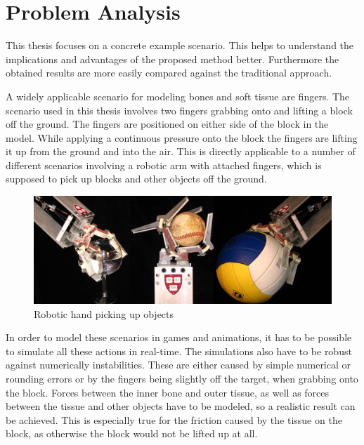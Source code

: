 \chapter{Problem Analysis}
\label{cha:problem_analysis}

This thesis focuses on a concrete example scenario. This helps to understand the implications and advantages of the proposed method better. Furthermore the obtained results are more easily compared against the traditional approach.

A widely applicable scenario for modeling bones and soft tissue are fingers. The scenario used in this thesis involves two fingers grabbing onto and lifting a block off the ground. The fingers are positioned on either side of the block in the model. While applying a continuous pressure onto the block the fingers are lifting it up from the ground and into the air. This is directly applicable to a number of different scenarios involving a robotic arm with attached fingers, which is supposed to pick up blocks and other objects off the ground.

\begin{figure}[htb]
\centering
\includegraphics[width=.96\textwidth]{images/robot_grabbing.png}
\caption[Robotic hand picking up objects]{Robotic hand picking up objects\protect\footnotemark}
\label{img:robot_grabbing}
\end{figure}

In order to model these scenarios in games and animations, it has to be possible to simulate all these actions in real-time. The simulations also have to be robust against numerically instabilities. These are either caused by simple numerical or rounding errors or by the fingers being slightly off the target, when grabbing onto the block. Forces between the inner bone and outer tissue, as well as forces between the tissue and other objects have to be modeled, so a realistic result can be achieved. This is especially true for the friction caused by the tissue on the block, as otherwise the block would not be lifted up at all.

